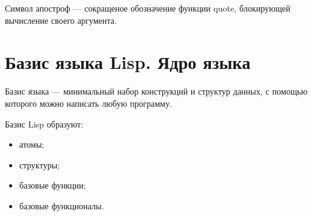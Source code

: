 Символ апостроф --- сокращеное обозначение функции quote, блокирующей
вычисление своего аргумента.

\section{Базис языка Lisp. Ядро языка}

Базис языка --- минимальный набор конструкций и структур данных, с помощью
которого можно написать любую программу.

Базис Lisp образуют:
\begin{itemize}
    \item атомы;
    \item структуры;
    \item базовые функции;
    \item базовые функционалы.
\end{itemize}

